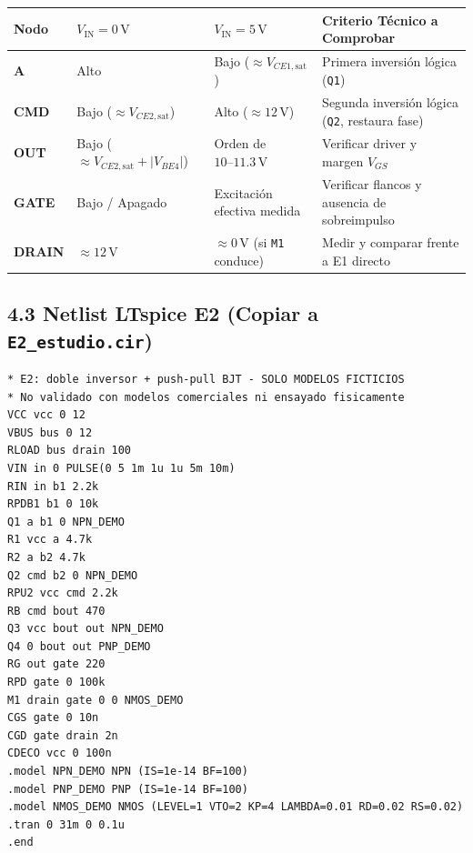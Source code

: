 \documentclass[10pt, a4paper, landscape]{article}
\begin{document}
\par\vspace{0.1cm}\noindent
\renewcommand{\arraystretch}{1.2}
\begin{tabularx}{\linewidth}{|l|l|l|X|}
\hline
\rowcolor{ucbgray}
\textbf{Nodo} & \textbf{$V_{\text{IN}} = 0\,\text{V}$} & \textbf{$V_{\text{IN}} = 5\,\text{V}$} & \textbf{Criterio Técnico a Comprobar} \\ \hline
\textbf{A} & Alto & Bajo ($\approx V_{CE1,\text{sat}}$) & Primera inversión lógica (\texttt{Q1}) \\ \hline
\textbf{CMD} & Bajo ($\approx V_{CE2,\text{sat}}$) & Alto ($\approx 12\,\text{V}$) & Segunda inversión lógica (\texttt{Q2}, restaura fase) \\ \hline
\textbf{OUT} & Bajo ($\approx V_{CE2,\text{sat}} + |V_{BE4}|$) & Orden de $10\text{--}11.3\,\text{V}$ & Verificar driver y margen $V_{GS}$ \\ \hline
\textbf{GATE} & Bajo / Apagado & Excitación efectiva medida & Verificar flancos y ausencia de sobreimpulso \\ \hline
\textbf{DRAIN} & $\approx 12\,\text{V}$ & $\approx 0\,\text{V}$ (si \texttt{M1} conduce) & Medir y comparar frente a E1 directo \\ \hline
\end{tabularx}

\subsection*{4.3 Netlist LTspice E2 (Copiar a \texttt{E2\_estudio.cir})}
\begin{verbatim}
* E2: doble inversor + push-pull BJT - SOLO MODELOS FICTICIOS
* No validado con modelos comerciales ni ensayado fisicamente
VCC vcc 0 12
VBUS bus 0 12
RLOAD bus drain 100
VIN in 0 PULSE(0 5 1m 1u 1u 5m 10m)
RIN in b1 2.2k
RPDB1 b1 0 10k
Q1 a b1 0 NPN_DEMO
R1 vcc a 4.7k
R2 a b2 4.7k
Q2 cmd b2 0 NPN_DEMO
RPU2 vcc cmd 2.2k
RB cmd bout 470
Q3 vcc bout out NPN_DEMO
Q4 0 bout out PNP_DEMO
RG out gate 220
RPD gate 0 100k
M1 drain gate 0 0 NMOS_DEMO
CGS gate 0 10n
CGD gate drain 2n
CDECO vcc 0 100n
.model NPN_DEMO NPN (IS=1e-14 BF=100)
.model PNP_DEMO PNP (IS=1e-14 BF=100)
.model NMOS_DEMO NMOS (LEVEL=1 VTO=2 KP=4 LAMBDA=0.01 RD=0.02 RS=0.02)
.tran 0 31m 0 0.1u
.end
\end{verbatim}
\end{document}

